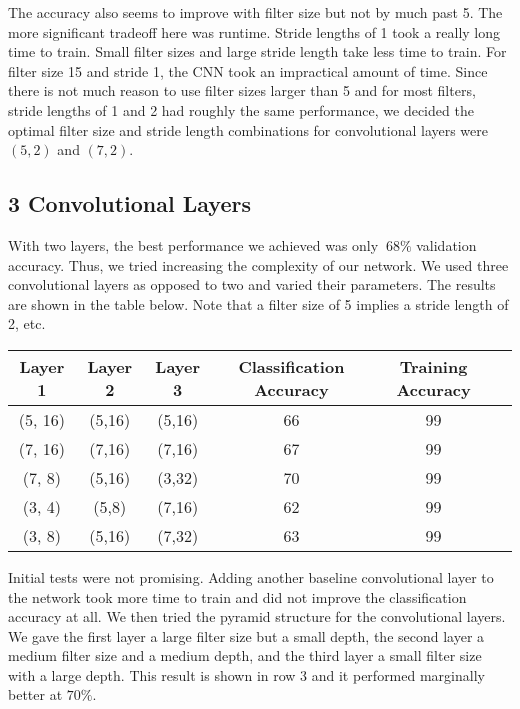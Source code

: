 \documentclass[10pt,twoside]{article}
\begin{document}
 The accuracy also seems to improve with filter size but not by much past 5. The more significant tradeoff here was runtime. Stride lengths of 1 took a really long time to train. Small filter sizes and large stride length take less time to train. For filter size 15 and stride 1, the CNN took an impractical amount of time. Since there is not much reason to use filter sizes larger than 5 and for most filters, stride lengths of 1 and 2 had roughly the same performance, we decided the optimal filter size and stride length combinations for convolutional layers were $(5,2)$ and $(7,2)$.

\subsection{3 Convolutional Layers}
With two layers, the best performance we achieved was only $~68\%$ validation accuracy. Thus, we tried increasing the complexity of our network. We used three convolutional layers as opposed to two and varied their parameters. The results are shown in the table below.
Note that a filter size of 5 implies a stride length of 2, etc.

\begin{center}
 \begin{tabular}{||c c c c c c||} 
 \hline
 Layer 1 & Layer 2 & Layer 3 & Classification Accuracy & Training Accuracy \\ [0.5ex] 
 \hline\hline
 (5, 16) & (5,16) & (5,16) & 66 & 99 \\ 
 \hline
 (7, 16) & (7,16) & (7,16) & 67 & 99 \\ 
 \hline
 (7, 8)  & (5,16) & (3,32) & 70 & 99 \\ 
 \hline
 (3, 4)  & (5,8) & (7,16) & 62 & 99 \\ 
 \hline
 (3, 8)  & (5,16) & (7,32) & 63 & 99 \\ 
 \hline
\end{tabular}
\end{center}

Initial tests were not promising. Adding another baseline convolutional layer to the network took more time to train and did not improve the classification accuracy at all. We then tried the pyramid structure for the convolutional layers. We gave the first layer a large filter size but a small depth, the second layer a medium filter size and a medium depth, and the third layer a small filter size with a large depth. This result is shown in row 3 and it performed marginally better at $70\%$.
\end{document}
